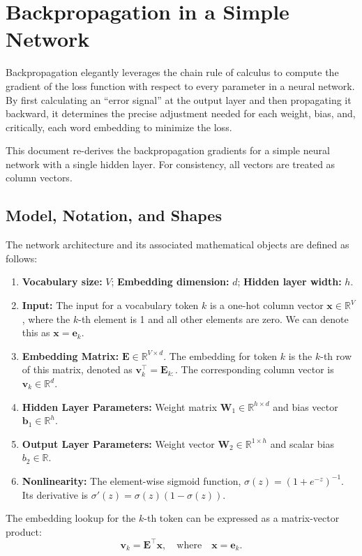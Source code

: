 \documentclass[%
  reprint,
  superscriptaddress,
  showpacs,
  showkeys,
  amsmath,amssymb,
  pra,
  longbibliography,
  floatfix,
  x11names
]{revtex4-2}
\begin{document}
\section{Backpropagation in a Simple Network}
\label{app:backp}

Backpropagation elegantly leverages the chain rule of calculus to compute the gradient of the loss function with respect to every parameter in a neural network. By first calculating an ``error signal'' at the output layer and then propagating it backward, it determines the precise adjustment needed for each weight, bias, and, critically, each word embedding to minimize the loss.

This document re-derives the backpropagation gradients for a simple neural network with a single hidden layer. For consistency, all vectors are treated as column vectors.

\subsection{Model, Notation, and Shapes}
The network architecture and its associated mathematical objects are defined as follows:
\begin{enumerate}
    \item \textbf{Vocabulary size:} $V$; \textbf{Embedding dimension:} $d$; \textbf{Hidden layer width:} $h$.
    \item \textbf{Input:} The input for a vocabulary token $k$ is a one-hot column vector $\bm{x} \in \mathbb{R}^V$, where the $k$-th element is 1 and all other elements are zero. We can denote this as $\bm{x} = \bm{e}_k$.
    \item \textbf{Embedding Matrix:} $\bm{E} \in \mathbb{R}^{V \times d}$. The embedding for token $k$ is the $k$-th row of this matrix, denoted as $\bm{v}_k^\intercal = \bm{E}_{k:}$. The corresponding column vector is $\bm{v}_k \in \mathbb{R}^d$.
    \item \textbf{Hidden Layer Parameters:} Weight matrix $\bm{W}_1 \in \mathbb{R}^{h \times d}$ and bias vector $\bm{b}_1 \in \mathbb{R}^h$.
    \item \textbf{Output Layer Parameters:} Weight vector $\bm{W}_2 \in \mathbb{R}^{1 \times h}$ and scalar bias $b_2 \in \mathbb{R}$.
    \item \textbf{Nonlinearity:} The element-wise sigmoid function, $\sigma(z) = (1+e^{-z})^{-1}$. Its derivative is $\sigma'(z) = \sigma(z)(1-\sigma(z))$.
\end{enumerate}

The embedding lookup for the $k$-th token can be expressed as a matrix-vector product:
\begin{equation}
\bm{v}_k = \bm{E}^\intercal \bm{x}, \quad \text{where} \quad \bm{x}=\bm{e}_k.
\end{equation}
\end{document}
